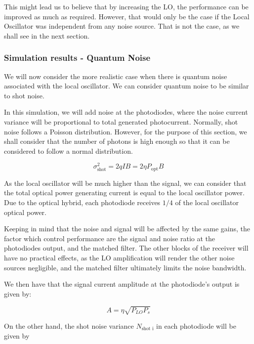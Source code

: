 This might lead us to believe that by increasing the LO, the performance can be 
improved as much as required. However, that would only be the case if the Local 
	Oscillator was independent from any noise source. That is not the case, as we 
shall see in the next section.

\clearpage

\subsubsection{Simulation results - Quantum 
Noise}\label{sec:simRes_quantumNoise}

We will now consider the more realistic case when there is quantum noise 
associated with the local oscillator. We can consider quantum noise to be 
similar to shot noise.

In this simulation, we will add noise at the photodiodes, where the noise 
current variance will be proportional to total generated photocurrent. 
Normally, shot noise follows a Poisson distribution. However, for the purpose 
of this section, we shall consider that the number of photons is high enough so 
that it can be considered to follow a normal distribution.

\begin{equation}
\sigma_{\text{shot}}^2 = 2 q I B = 2 \eta P_\text{opt} B
\end{equation}

As the local oscillator will be much higher than the signal, we can consider 
that the total optical power generating current is equal to the local 
oscillator power. Due to the optical hybrid, each photodiode receives $1/4$ of 
the local oscillator optical power.

Keeping in mind that the noise and signal will be affected by the same gains, 
the factor which control performance are the signal and noise ratio at the 
photodiodes output, and the matched filter. The other blocks of the receiver 
will have no practical effects, as the LO amplification will render the other 
noise sources negligible, and the matched filter ultimately limits the noise 
bandwidth.

We then have that the signal current amplitude at the photodiode's output is 
given by:

\begin{equation}
	A = \eta \sqrt{ P_{LO} P_s }
\end{equation}


On the other hand, the shot noise variance $N_\text{shot i}$ in each photodiode 
will be given by

